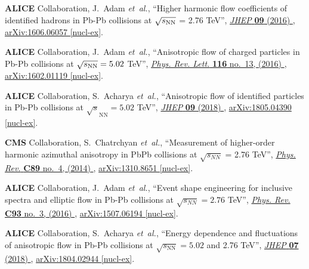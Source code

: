 \documentclass[ALICE,manyauthors]{cernphprep}
\begin{document}
\begin{thebibliography}{10}
{\bfseries ALICE} Collaboration, J.~Adam {\em et~al.}, ``{Higher harmonic flow
  coefficients of identified hadrons in Pb-Pb collisions at $\sqrt{s_{\rm NN}}$
  = 2.76 TeV}'', \href{http://dx.doi.org/10.1007/JHEP09(2016)164}{{\em JHEP}
  {\bfseries 09} (2016) },
\href{http://arxiv.org/abs/1606.06057}{{\ttfamily arXiv:1606.06057 [nucl-ex]}}.

{\bfseries ALICE} Collaboration, J.~Adam {\em et~al.}, ``{Anisotropic flow of
  charged particles in Pb-Pb collisions at $\sqrt{s_{\rm NN}}=5.02$ TeV}'',
  \href{http://dx.doi.org/10.1103/PhysRevLett.116.132302}{{\em Phys. Rev.
  Lett.} {\bfseries 116} no.~13, (2016) },
\href{http://arxiv.org/abs/1602.01119}{{\ttfamily arXiv:1602.01119 [nucl-ex]}}.

{\bfseries ALICE} Collaboration, S.~Acharya {\em et~al.}, ``{Anisotropic flow
  of identified particles in Pb-Pb collisions at $
  {\sqrt{s}}_{\mathrm{NN}}=5.02 $ TeV}'',
  \href{http://dx.doi.org/10.1007/JHEP09(2018)006}{{\em JHEP} {\bfseries 09}
  (2018) },
\href{http://arxiv.org/abs/1805.04390}{{\ttfamily arXiv:1805.04390 [nucl-ex]}}.

{\bfseries CMS} Collaboration, S.~Chatrchyan {\em et~al.}, ``{Measurement of
  higher-order harmonic azimuthal anisotropy in PbPb collisions at
  $\sqrt{s_{NN}}$ = 2.76 TeV}'',
  \href{http://dx.doi.org/10.1103/PhysRevC.89.044906}{{\em Phys. Rev.}
  {\bfseries C89} no.~4, (2014) },
\href{http://arxiv.org/abs/1310.8651}{{\ttfamily arXiv:1310.8651 [nucl-ex]}}.

{\bfseries ALICE} Collaboration, J.~Adam {\em et~al.}, ``{Event shape
  engineering for inclusive spectra and elliptic flow in Pb-Pb collisions at
  $\sqrt{s_{NN}} = 2.76$ TeV}'',
  \href{http://dx.doi.org/10.1103/PhysRevC.93.034916}{{\em Phys. Rev.}
  {\bfseries C93} no.~3, (2016) },
\href{http://arxiv.org/abs/1507.06194}{{\ttfamily arXiv:1507.06194 [nucl-ex]}}.

{\bfseries ALICE} Collaboration, S.~Acharya {\em et~al.}, ``{Energy dependence
  and fluctuations of anisotropic flow in Pb-Pb collisions at $
  \sqrt{s_{\mathrm{NN}}}=5.02 $ and 2.76 TeV}'',
  \href{http://dx.doi.org/10.1007/JHEP07(2018)103}{{\em JHEP} {\bfseries 07}
  (2018) },
\href{http://arxiv.org/abs/1804.02944}{{\ttfamily arXiv:1804.02944 [nucl-ex]}}.


\end{thebibliography}
\end{document}

